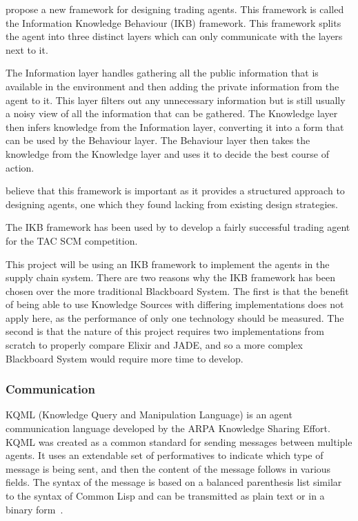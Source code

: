  propose a new framework for designing trading agents.
This framework is called the Information Knowledge Behaviour (IKB) framework.
This framework splits the agent into three distinct layers which can only communicate with the layers next to it.

The Information layer handles gathering all the public information that is available in the environment and then adding the private information from the agent to it.
This layer filters out any unnecessary information but is still usually a noisy view of all the information that can be gathered.
The Knowledge layer then infers knowledge from the Information layer, converting it into a form that can be used by the Behaviour layer.
The Behaviour layer then takes the knowledge from the Knowledge layer and uses it to decide the best course of action.

 believe that this framework is important as it provides a structured approach to designing agents, one which they found lacking from existing design strategies.

The IKB framework has been used by  to develop a fairly successful trading agent for the TAC SCM competition.

This project will be using an IKB framework to implement the agents in the supply chain system.
There are two reasons why the IKB framework has been chosen over the more traditional Blackboard System.
The first is that the benefit of being able to use Knowledge Sources with differing implementations does not apply here, as the performance of only one technology should be measured.
The second is that the nature of this project requires two implementations from scratch to properly compare Elixir and JADE, and so a more complex Blackboard System would require more time to develop.

\subsubsection{Communication}

KQML (Knowledge Query and Manipulation Language) is an agent communication language developed by the ARPA Knowledge Sharing Effort.
KQML was created as a common standard for sending messages between multiple agents.
It uses an extendable set of performatives to indicate which type of message is being sent, and then the content of the message follows in various fields.
The syntax of the message is based on a balanced parenthesis list similar to the syntax of Common Lisp and can be transmitted as plain text or in a binary form~\cite{finin1994kqml}.

